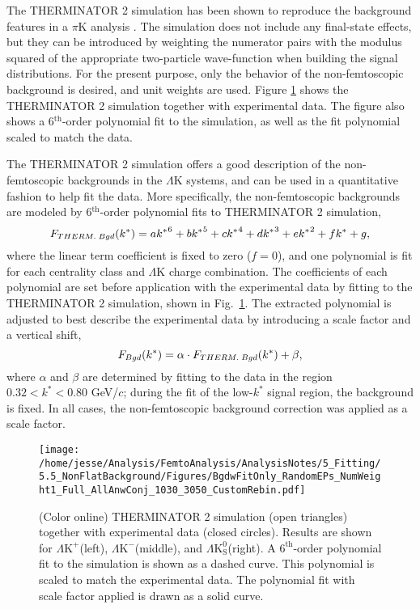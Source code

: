 \documentclass[ALICE,manyauthors]{cernphprep}
\newcommand{\kstar}{$k^{*}$\xspace}
\newcommand{\LamK}{$\Lambda$K\xspace}
\newcommand{\LamKchP}{$\Lambda\mathrm{K^{+}}$\xspace}
\newcommand{\LamKchM}{$\Lambda\mathrm{K^{-}}$\xspace}
\newcommand{\LamKs}{$\Lambda\mathrm{K^{0}_{S}}$\xspace}
\begin{document}
The THERMINATOR 2 simulation has been shown to reproduce the background features in a $\pi$K analysis \cite{Kisiel:2017}. 
The simulation does not include any final-state effects, but they can be introduced by weighting the numerator pairs with the modulus squared of the appropriate two-particle wave-function when building the signal distributions. 
For the present purpose, only the behavior of the non-femtoscopic background is desired, and unit weights are used.
Figure \ref{fig:BgdswTHERM} shows the THERMINATOR 2 simulation together with experimental data.  
The figure also shows a 6$^{\mathrm{th}}$-order polynomial fit to the simulation, as well as the fit polynomial scaled to match the data.

The THERMINATOR 2 simulation offers a good description of the non-femtoscopic backgrounds in the \LamK systems, and can be used in a quantitative fashion to help fit the data.
More specifically, the non-femtoscopic backgrounds are modeled by 6$^{\mathrm{th}}$-order polynomial fits to THERMINATOR 2 simulation,
\begin{equation}
F_{\scaleto{THERM.\; Bgd}{6pt}}(k^{*}) = a{k^{*}}^{6}+ b{k^{*}}^{5} + c{k^{*}}^{4} + d{k^{*}}^{3} + e{k^{*}}^{2} + fk^{*} + g,
\end{equation}
where the linear term coefficient is fixed to zero ($f=0$), and one polynomial is fit for each centrality class and \LamK charge combination.
The coefficients of each polynomial are set before application with the experimental data by fitting to the THERMINATOR 2 simulation, shown in Fig.\ \ref{fig:BgdswTHERM}.
The extracted polynomial is adjusted to best describe the experimental data by introducing a scale factor and a vertical shift,
\begin{equation}
F_{\scaleto{Bgd}{6pt}}(k^{*}) = \alpha\cdot F_{\scaleto{THERM.\; Bgd}{6pt}}(k^{*}) + \beta,
\end{equation}
where $\alpha$ and $\beta$ are determined by fitting to the data in the region $0.32 < k^{*} < 0.80$ GeV/$c$; during the fit of the low-\kstar signal region, the background is fixed.
In all cases, the non-femtoscopic background correction was applied as a scale factor.


\begin{figure}[h]
  \centering
  \texttt{[image: /home/jesse/Analysis/FemtoAnalysis/AnalysisNotes/5\_Fitting/5.5\_NonFlatBackground/Figures/BgdwFitOnly\_RandomEPs\_NumWeight1\_Full\_AllAnwConj\_1030\_3050\_CustomRebin.pdf]}
  \caption[Backgrounds with THERMINATOR 2]
  {
  (Color online) THERMINATOR 2 simulation (open triangles) together with experimental data (closed circles).  
  Results are shown for \LamKchP (left), \LamKchM (middle), and \LamKs (right).
  A $6^{\mathrm{th}}$-order polynomial fit to the simulation is shown as a dashed curve.  
  This polynomial is scaled to match the experimental data.  
  The polynomial fit with scale factor applied is drawn as a solid curve.
  }
  \label{fig:BgdswTHERM}
\end{figure} 
\end{document}
